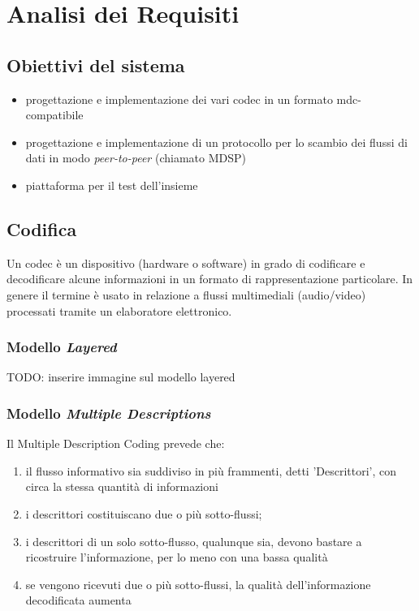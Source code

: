 \chapter{Analisi dei Requisiti}

\section{Obiettivi del sistema}


\begin{itemize}
\item progettazione e implementazione dei vari codec in un formato mdc-compatibile
\item progettazione e implementazione di un protocollo per lo scambio dei
flussi di dati in modo \emph{peer-to-peer} (chiamato MDSP)
\item piattaforma per il test dell'insieme
\end{itemize}


\section{Codifica}


Un codec è un dispositivo (hardware o software) in grado di codificare e
decodificare alcune informazioni in un formato di rappresentazione particolare.
In genere il termine è usato in relazione a flussi multimediali (audio/video)
processati tramite un elaboratore elettronico.



\subsection{Modello \emph{Layered}}

TODO: inserire immagine sul modello layered

\subsection{Modello \emph{Multiple Descriptions}}

Il Multiple Description Coding prevede che:
\begin{enumerate}
\item il flusso informativo sia suddiviso in più frammenti, detti 'Descrittori', con circa la stessa quantità di informazioni
\item i descrittori costituiscano due o più sotto-flussi;
\item i descrittori di un solo sotto-flusso, qualunque sia, devono bastare a ricostruire l'informazione, per lo meno con una bassa qualità
\item se vengono ricevuti due o più sotto-flussi, la qualità dell'informazione decodificata aumenta 
\end{enumerate}

